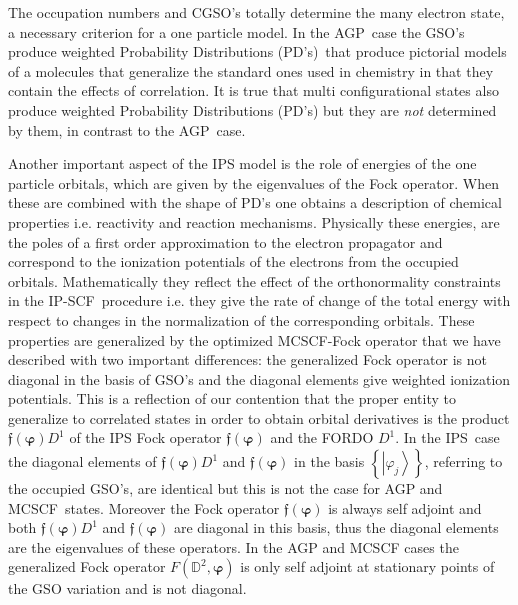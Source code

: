 \documentclass[aps,preprint]{revtex4}%
\begin{document}
The occupation numbers and CGSO's totally determine the many electron state, a
necessary criterion for a one particle model. In the AGP\ case the GSO's
produce weighted Probability Distributions (PD's)\ that produce pictorial
models of a molecules that generalize the standard ones used in chemistry in
that they contain the effects of correlation. It is true that multi
configurational states also produce weighted Probability Distributions (PD's)
but they are \emph{not} determined by them, in contrast to the AGP\ case.

Another important aspect of the IPS model is the role of energies of the one
particle orbitals, which are given by the eigenvalues of the Fock operator.
When these are combined with the shape of PD's one obtains a description of
chemical properties i.e. reactivity and reaction mechanisms. Physically these
energies, are the poles of a first order approximation to the electron
propagator and correspond to the ionization potentials of the electrons from
the occupied orbitals. Mathematically they reflect the effect of the
orthonormality constraints in the IP-SCF\ procedure i.e. they give the rate of
change of the total energy with respect to changes in the normalization of the
corresponding orbitals. These properties are generalized by the optimized
MCSCF-Fock operator that we have described with two important differences: the
generalized Fock operator is not diagonal in the basis of GSO's and the
diagonal elements give weighted ionization potentials. This is a reflection of
our contention that the proper entity to generalize to correlated states in
order to obtain orbital derivatives is the product $\mathfrak{f}\left(
\mathbf{\varphi}\right)  D^{1}$ of the IPS Fock operator $\mathfrak{f}\left(
\mathbf{\varphi}\right)  $ and the FORDO $D^{1}$. In the IPS\ case the
diagonal elements of $\mathfrak{f}\left(  \mathbf{\varphi}\right)  D^{1}$ and
$\mathfrak{f}\left(  \mathbf{\varphi}\right)  $ in the basis $\left\{
\left\vert \varphi_{j}\right\rangle \right\}  $, referring to the occupied
GSO's, are identical but this is not the case for AGP and MCSCF\ states.
Moreover the Fock operator $\mathfrak{f}\left(  \mathbf{\varphi}\right)  $ is
always self adjoint and both $\mathfrak{f}\left(  \mathbf{\varphi}\right)
D^{1}$ and $\mathfrak{f}\left(  \mathbf{\varphi}\right)  $ are diagonal in
this basis, thus the diagonal elements are the eigenvalues of these operators.
In the AGP and MCSCF cases the generalized Fock operator $F\left(
\mathbb{D}^{2},\mathbf{\varphi}\right)  $ is only self adjoint at stationary
points of the GSO variation and is not diagonal.
\end{document}
